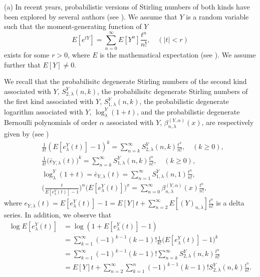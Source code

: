 \documentclass[a4paper,11pt]{amsart}
\begin{document}
\noindent(a) In recent years, probabilistic versions of Stirling numbers of both kinds have been explored by several authors (see \cite{1,3,8,21,28}). We assume that $Y$ is a random variable such that the moment-generating function of $Y$
\begin{equation*} 
E[e^{tY}]=\sum_{n=0}^{\infty}E[Y^{n}]\frac{t^{n}}{n!}, \quad (|t|<r)
\end{equation*}
exists for some $r > 0$, where $E$ is the mathematical expectation (see \cite{1,3,26}). We assume further that $E[Y] \ne 0$. \par
We recall that the probabilisitc degenerate Stirling numbers of the second kind associated with $Y$, $S_{2,\lambda}^{Y}(n,k)$, the probabilisitc degenerate Stirling numbers of the first kind associated with $Y$, $S_{1,\lambda}^{Y}(n,k)$, the probabilistic degenerate logarithm associated with $Y$, $\log_{\lambda}^{Y}(1+t)$, and the probabilistic degenerate Bernoulli polynomials of order $\alpha$ associated with $Y$, $\beta_{n,\lambda}^{(Y,\alpha)}(x)$, are respectively given by (see \cite{9,15,22})
\begin{equation} \label{35}
\begin{aligned}
&\frac{1}{k!}(E[e_{\lambda}^{Y}(t)]-1)^{k}=\sum_{n=k}^{\infty}S_{2,\lambda}^{Y}(n,k)\frac{t^{n}}{n!},\quad (k \ge 0), \\
&\frac{1}{k!}\big(\bar{e}_{Y,\lambda}(t)\big)^{k}=\sum_{n=k}^{\infty}S_{1,\lambda}^{Y}(n,k)\frac{t^{n}}{n!}, \quad (k \ge 0), \\
&\log_{\lambda}^{Y}(1+t)=\bar{e}_{Y,\lambda}(t)=\sum_{n=1}^{\infty}S_{1,\lambda}^{Y}(n,1)\frac{t^{n}}{n!}, \\
&\bigg(\frac{t}{E[e_{\lambda}^{Y}(t)]-1}\bigg)^{\alpha}\Big(E[e_{\lambda}^{Y}(t)]\Big)^{x}=\sum_{n=0}^{\infty}\beta_{n,\lambda}^{(Y,\alpha)}(x)\frac{t^{n}}{n!},
\end{aligned}
\end{equation}
where $e_{Y,\lambda}(t)=E[e_{\lambda}^{Y}(t)]-1=E[Y]t+\sum_{n=2}^{\infty}E[(Y)_{n,\lambda}]\frac{t^{n}}{n!}$ is a delta series.
In addition, we observe that
\begin{align*}
\log E[e_{\lambda}^{Y}(t)]&=\log(1+E[e_{\lambda}^{Y}(t)]-1) \\
&=\sum_{k=1}^{\infty}(-1)^{k-1}(k-1)!\frac{1}{k!}\big(E[e_{\lambda}^{Y}(t)]-1\big)^{k} \\
&=\sum_{k=1}^{\infty}(-1)^{k-1}(k-1)!\sum_{n=k}^{\infty}S_{2,\lambda}^{Y}(n,k)\frac{t^{n}}{n!} \\
&=E[Y]t+\sum_{n=2}^{\infty}\sum_{k=1}^{n}(-1)^{k-1}(k-1)!S_{2,\lambda}^{Y}(n,k)\frac{t^{n}}{n!}.
\end{align*}
\end{document}
